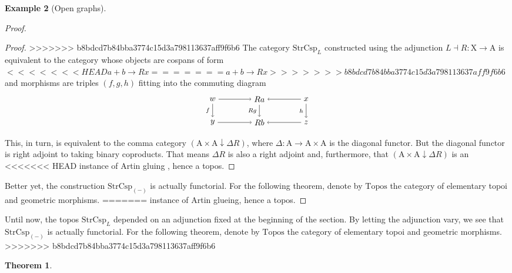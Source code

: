\documentclass{amsart}
\newcommand{\A}{\cat{A}}
\newcommand{\X}{\cat{X}}
\newcommand{\Topos}{\cat{Topos}}
\newcommand{\StrCsp}{\cat{StrCsp}}
\newcommand{\cat}[1]{\mathrm{#1}}
\newcommand{\from}{\colon}
\newcommand{\csp}[3]{#1 + #3 \to #2}
\newtheorem{theorem}{Theorem}[section]
\theoremstyle{remark}
\theoremstyle{definition}
\newtheorem{example}[theorem]{Example}
\begin{document}
\begin{example}[Open graphs]
\begin{proof}
\begin{proof}
>>>>>>> b8bdcd7b84bba3774c15d3a798113637aff9f6b6
  The category $ \StrCsp_L $ constructed using the adjunction
  $ L \dashv R \from \X \to \A $ is equivalent to the category
  whose objects are cospans of form
  \(
<<<<<<< HEAD
    \csp{a}{Rx}{b}
=======
      \csp{a}{Rx}{b}
>>>>>>> b8bdcd7b84bba3774c15d3a798113637aff9f6b6
  \)
  and morphisms are triples $ ( f,g,h ) $ fitting into the commuting
  diagram
  \[
    \begin{tikzpicture}
      \node (1) at (-2,1) {\( w \)};
      \node (2) at (0,1) {\( Ra \)};
      \node (3) at (2,1) {\( x \)};
      \node (4) at (-2,0) {\( y \)};
      \node (5) at (0,0) {\( Rb \)};
      \node (6) at (2,0) {\( z \)};
      \draw [->] (1) to  node [] {\scriptsize{\(  \)}} (2);
      \draw [->] (3) to node [] {\scriptsize{\(  \)}} (2);
      \draw [->] (4) to node [] {\scriptsize{\(  \)}} (5);
      \draw [->] (6) to node [] {\scriptsize{\(  \)}} (5);
      \draw [->] (1) to node [left] {\scriptsize{\( f \)}} (4);
      \draw [->] (2) to node [left] {\scriptsize{\( Rg \)}} (5);
      \draw [->] (3) to node [left] {\scriptsize{\( h \)}} (6); 
    \end{tikzpicture}
  \]
  This, in turn, is equivalent to the comma category
  $ ( \A \times \A \downarrow \Delta R ) $, where
  $ \Delta \from \A \to \A \times \A $ is the diagonal functor. But
  the diagonal functor is right adjoint to taking binary
  coproducts. That means $ \Delta R $ is also a right adjoint and,
  furthermore, that $ ( \A \times \A \downarrow \Delta R ) $ is an
<<<<<<< HEAD
  instance of Artin gluing \cite{Wraith_ArtinGlue}, hence a topos.
\end{proof}

Better yet, the construction $ \StrCsp_{(-)} $ is actually
functorial. For the following theorem, denote by $ \Topos $ the
category of elementary topoi and geometric morphisms.
=======
  instance of Artin glueing,
  hence a topos.
%
\end{proof}

Until now, the topos $ \StrCsp_L $ depended on an adjunction fixed at
the beginning of the section.  By letting the adjunction vary, we see
that $ \StrCsp_{(-)} $ is actually functorial. For the following theorem, denote by $ \Topos $ the category of
elementary topoi and geometric morphisms.
>>>>>>> b8bdcd7b84bba3774c15d3a798113637aff9f6b6

\begin{theorem} \label{thm:strcsp-isfunctorial}


\end{theorem}
\end{example}
\end{document}
